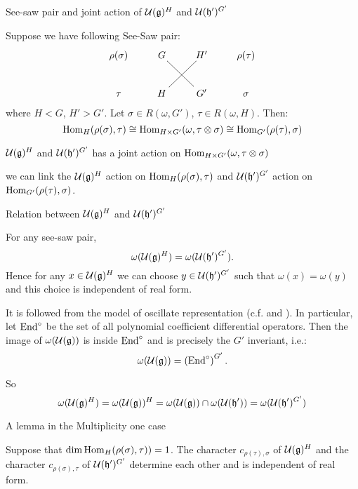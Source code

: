 \documentclass{beamer}
\begin{document}
\begin{frame}{See-saw pair and  joint action of $\mathcal{U}(\mathfrak{g})^H$ 
and $\mathcal{U}(\mathfrak{h}')^{G'}$}


Suppose we have following See-Saw pair:
\[
\xymatrix{
\rho(\sigma)& G \ar@{-}[dr] & H'& \rho(\tau)\\
\tau &H\ar@{-}[ur] & G' & \sigma
}
\]
where $H < G$, $H'> G'$. Let $\sigma\in R(\omega, G')$, $\tau\in R(\omega,H)$.
Then:
\[
{\rm Hom}_{H}(\rho(\sigma), \tau) 
\cong  {\rm Hom}_{H\times G'}(\omega, \tau\otimes \sigma)
\cong  {\rm Hom}_{G'}(\rho(\tau), \sigma)
\]

{\color{blue}
 $\mathcal{U}(\mathfrak{g})^H$ and $\mathcal{U}(\mathfrak{h}')^{G'}$ 
has a joint action on ${\rm Hom}_{H\times G'}(\omega,\tau\otimes\sigma)$

we can link the $\mathcal{U}(\mathfrak{g})^H$ action on ${\rm Hom}_H(\rho(\sigma),\tau)$ and $\mathcal{U}(\mathfrak{h}')^{G'}$  action on ${\rm Hom}_{G'}(\rho(\tau),\sigma)$.
}
\end{frame}

\begin{frame}{Relation between $\mathcal{U}(\mathfrak{g})^H$ and $\mathcal{U}(\mathfrak{h}')^{G'}$}
\begin{lemma}\label{lemma:ugkcorr}
For any see-saw pair, 
\[
\omega(\mathcal{U}(\mathfrak{g})^H) = \omega(\mathcal{U}(\mathfrak{h}')^{G'}).
\]
Hence for any $x\in \mathcal{U}(\mathfrak{g})^H$ we can choose $y\in \mathcal{U}(\mathfrak{h}')^{G'}$ 
such that $\omega(x) = \omega(y)$ and this choice is independent of real form.
\end{lemma}

It is followed from the model of oscillate representation (c.f. \cite{Adams2007} 
and \cite{Howe1989Rem}).
In particular, let ${\rm End}^\circ$ be the set of all polynomial coefficient differential operators.
Then the image of $\omega(\mathcal{U}(\mathfrak{g}))$ is inside ${\rm End}^\circ$ and is precisely the $G'$ inveriant, i.e.:
\[
\omega(\mathcal{U}(\mathfrak{g})) = \left({\rm End}^\circ\right)^{G'}.
\]

So 
\[
\omega(\mathcal{U}(\mathfrak{g})^H) = \omega(\mathcal{U}(\mathfrak{g}))^H = \omega(\mathcal{U}(\mathfrak{g}))\cap \omega(\mathcal{U}(\mathfrak{h}')) = \omega(\mathcal{U}(\mathfrak{h}')^{G'})
\]
\end{frame}

\begin{frame}{A lemma in the Multiplicity one case}
\begin{lemma}
Suppose that $\dim {\rm Hom}_H(\rho(\sigma),\tau)) =1$.
The character $c_{\rho(\tau),\sigma}$ of $\mathcal{U}(\mathfrak{g})^H$ and
 the character $c_{\rho(\sigma),\tau}$ of $\mathcal{U}(\mathfrak{h}')^{G'}$ determine each other 
and is independent of real form.
\end{lemma}

\end{frame}
\end{document}
